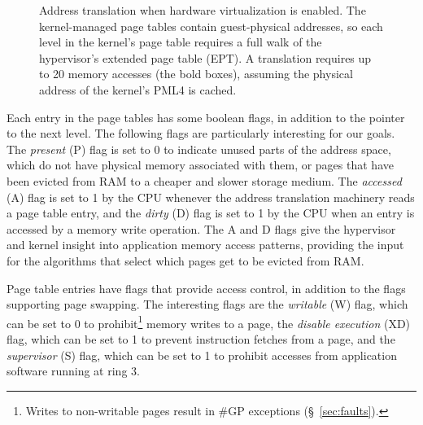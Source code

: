 \begin{figure}[hbtp]
  \caption{
    Address translation when hardware virtualization is enabled. The
    kernel-managed page tables contain guest-physical addresses, so each level
    in the kernel's page table requires a full walk of the hypervisor's
    extended page table (EPT).  A translation requires up to 20 memory accesses
    (the bold boxes), assuming the physical address of the kernel's PML4 is
    cached.
  }
  \label{fig:vmx_paging}
\end{figure}

Each entry in the page tables has some boolean flags, in addition to the
pointer to the next level. The following flags are particularly interesting for
our goals. The \textit{present} (P) flag is set to 0 to indicate unused parts
of the address space, which do not have physical memory associated with them,
or pages that have been evicted from RAM to a cheaper and slower storage
medium.  The \textit{accessed} (A) flag is set to 1 by the CPU whenever the
address translation machinery reads a page table entry, and the \textit{dirty}
(D) flag is set to 1 by the CPU when an entry is accessed by a memory write
operation. The A and D flags give the hypervisor and kernel insight into
application memory access patterns, providing the input for the algorithms that
select which pages get to be evicted from RAM.

Page table entries have flags that provide access control, in addition to the
flags supporting page swapping. The interesting flags are the \textit{writable}
(W) flag, which can be set to 0 to prohibit\footnote{Writes to non-writable
pages result in \#GP exceptions (\S~\ref{sec:faults}).} memory writes to a
page, the \textit{disable execution} (XD) flag, which can be set to 1 to
prevent instruction fetches from a page, and the \textit{supervisor} (S) flag,
which can be set to 1 to prohibit accesses from application software running at
ring 3.
